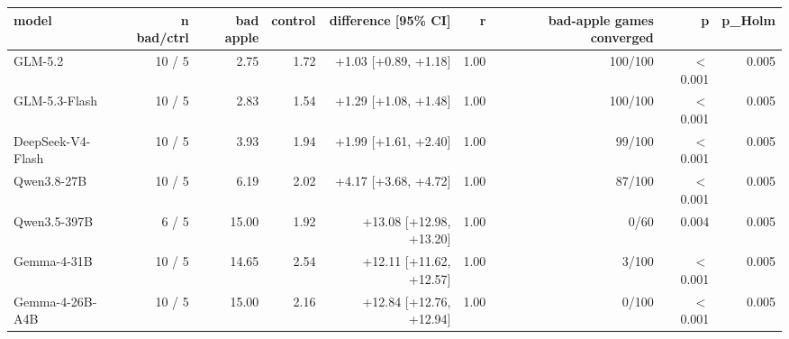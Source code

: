\begin{tabular}{lrrrrrrrr}
\toprule
\textbf{model} & \textbf{n bad/ctrl} & \textbf{bad apple} & \textbf{control} & \textbf{difference [95\% CI]} & \textbf{r} & \textbf{bad-apple games converged} & \textbf{p} & \textbf{p\_Holm} \\
\midrule
GLM-5.2 & 10 / 5 & 2.75 & 1.72 & +1.03 [+0.89, +1.18] & 1.00 & 100/100 & $<$0.001 & 0.005 \\
GLM-5.3-Flash & 10 / 5 & 2.83 & 1.54 & +1.29 [+1.08, +1.48] & 1.00 & 100/100 & $<$0.001 & 0.005 \\
DeepSeek-V4-Flash & 10 / 5 & 3.93 & 1.94 & +1.99 [+1.61, +2.40] & 1.00 & 99/100 & $<$0.001 & 0.005 \\
Qwen3.8-27B & 10 / 5 & 6.19 & 2.02 & +4.17 [+3.68, +4.72] & 1.00 & 87/100 & $<$0.001 & 0.005 \\
Qwen3.5-397B & 6 / 5 & 15.00 & 1.92 & +13.08 [+12.98, +13.20] & 1.00 & 0/60 & 0.004 & 0.005 \\
Gemma-4-31B & 10 / 5 & 14.65 & 2.54 & +12.11 [+11.62, +12.57] & 1.00 & 3/100 & $<$0.001 & 0.005 \\
Gemma-4-26B-A4B & 10 / 5 & 15.00 & 2.16 & +12.84 [+12.76, +12.94] & 1.00 & 0/100 & $<$0.001 & 0.005 \\
\bottomrule
\end{tabular}

